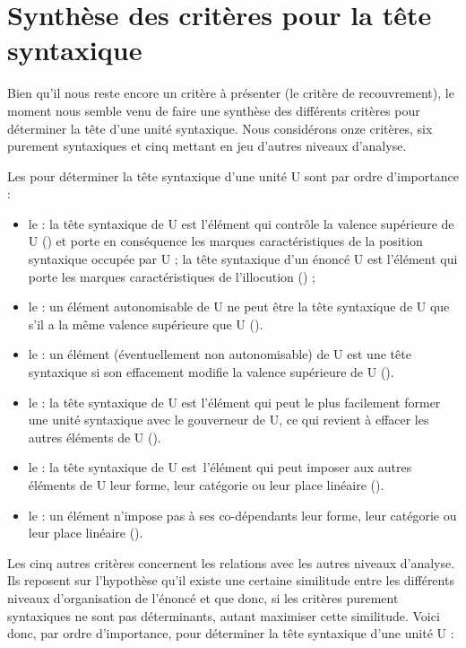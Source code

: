 \section{Synthèse des critères pour la tête syntaxique}\label{sec:3.3.20}

Bien qu’il nous reste encore un critère à présenter (le critère de recouvrement), le moment nous semble venu de faire une synthèse des différents critères pour déterminer la tête d’une unité syntaxique. Nous considérons onze critères, six purement syntaxiques et cinq mettant en jeu d’autres niveaux d’analyse.

Les  pour déterminer la tête syntaxique d’une unité U sont par ordre d’importance :

\begin{itemize}
\item le  : la tête syntaxique de U est l’élément qui contrôle la valence supérieure de U () et porte en conséquence les marques caractéristiques de la position syntaxique occupée par U ; la tête syntaxique d’un énoncé U est l’élément qui porte les marques caractéristiques de l’illocution () ;
\item le : un élément autonomisable de U ne peut être la tête syntaxique de U que s’il a la même valence supérieure que U ().
\item le : un élément (éventuellement non autonomisable) de U est une tête syntaxique si son effacement modifie la valence supérieure de U ().
\item le   : la tête syntaxique de U est l’élément qui peut le plus facilement former une unité syntaxique avec le gouverneur de U, ce qui revient à effacer les autres éléments de U ().
\item le  : la tête syntaxique de U est~l’élément qui peut imposer aux autres éléments de U leur forme, leur catégorie ou leur place linéaire ().
\item le  : un élément n'impose pas à ses co-dépendants leur forme, leur catégorie ou leur place linéaire ().
\end{itemize}

Les cinq autres critères concernent les relations avec les autres niveaux d’analyse. Ils reposent sur l’hypothèse qu’il existe une certaine similitude entre les différents niveaux d’organisation de l’énoncé et que donc, si les critères purement syntaxiques ne sont pas déterminants, autant maximiser cette similitude. Voici donc, par ordre d’importance,  pour déterminer la tête syntaxique d’une unité U :

